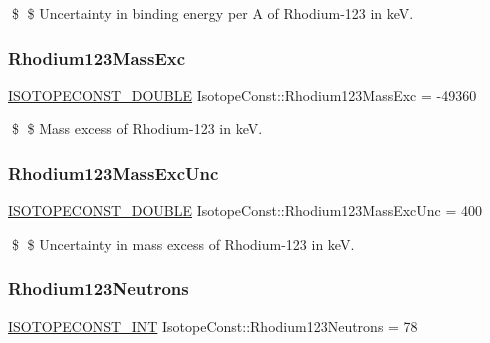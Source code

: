 \$ \$ Uncertainty in binding energy per A of Rhodium-\/123 in keV. \mbox{\label{group___isotope_const-_rhodium-_rh123_ga9970bc8d61b5068c945abb4ef4410355}} 
\subsubsection{\texorpdfstring{Rhodium123\+Mass\+Exc}{Rhodium123MassExc}}
{\footnotesize\ttfamily \mbox{\hyperlink{group___isotope_const-_macros_ga8f45a7272ce02c0b4c65c44636ed719a}{I\+S\+O\+T\+O\+P\+E\+C\+O\+N\+S\+T\+\_\+\+D\+O\+U\+B\+LE}} Isotope\+Const\+::\+Rhodium123\+Mass\+Exc = -\/49360}

\$ \$ Mass excess of Rhodium-\/123 in keV. \mbox{\label{group___isotope_const-_rhodium-_rh123_ga0756fde227c5a4c0d30be16c80f52f12}} 
\subsubsection{\texorpdfstring{Rhodium123\+Mass\+Exc\+Unc}{Rhodium123MassExcUnc}}
{\footnotesize\ttfamily \mbox{\hyperlink{group___isotope_const-_macros_ga8f45a7272ce02c0b4c65c44636ed719a}{I\+S\+O\+T\+O\+P\+E\+C\+O\+N\+S\+T\+\_\+\+D\+O\+U\+B\+LE}} Isotope\+Const\+::\+Rhodium123\+Mass\+Exc\+Unc = 400}

\$ \$ Uncertainty in mass excess of Rhodium-\/123 in keV. \mbox{\label{group___isotope_const-_rhodium-_rh123_gad272a65dbec42503eeda4eb275d8088b}} 
\subsubsection{\texorpdfstring{Rhodium123\+Neutrons}{Rhodium123Neutrons}}
{\footnotesize\ttfamily \mbox{\hyperlink{group___isotope_const-_macros_ga5f18360b3e99483a35c32d789e62621c}{I\+S\+O\+T\+O\+P\+E\+C\+O\+N\+S\+T\+\_\+\+I\+NT}} Isotope\+Const\+::\+Rhodium123\+Neutrons = 78}

